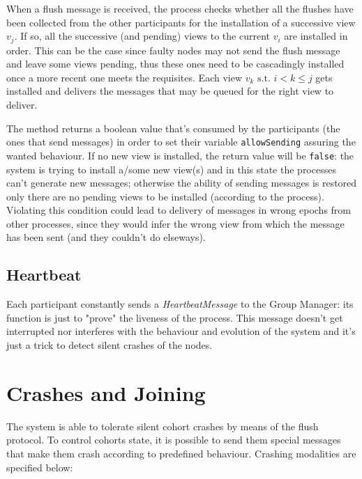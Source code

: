 \documentclass[11pt]{article}
\begin{document}
	When a flush message is received, the process checks whether all the flushes have been collected from the other participants for the installation of a successive view $v_{j}$. If so, all the successive (and pending) views to the current $v_{i}$ are installed in order. This can be the case since faulty nodes may not send the flush message and leave some views pending, thus these ones need to be cascadingly installed once a more recent one meets the requisites.\newline
	Each view $v_{k} \text{ s.t. } i < k \le j$ gets installed and delivers the messages that may be queued for the right view to deliver.\newline
	
	The method returns a boolean value that's consumed by the participants (the ones that send messages) in order to set their variable \texttt{allowSending} assuring the wanted behaviour. If no new view is installed, the return value will be \texttt{false}: the system is trying to install a/some new view(s) and in this state the processes can't generate new messages; otherwise the ability of sending messages is restored only there are no pending views to be installed (according to the process). Violating this condition could lead to delivery of messages in wrong epochs from other processes, since they would infer the wrong view from which the message has been sent (and they couldn't do elseways).
		
	\subsection{Heartbeat}
	Each participant constantly sends a \textit{HeartbeatMessage} to the Group Manager: its function is just to "prove" the liveness of the process. This message doesn't get interrupted nor interferes with the behaviour and evolution of the system and it's just a trick to detect silent crashes of the nodes.
	
	\section{Crashes and Joining}
	The system is able to tolerate silent cohort crashes by means of the flush protocol. To control cohorts state, it is possible to send them special messages that make them crash according to predefined behaviour. Crashing modalities are specified below:
	
\end{document}
